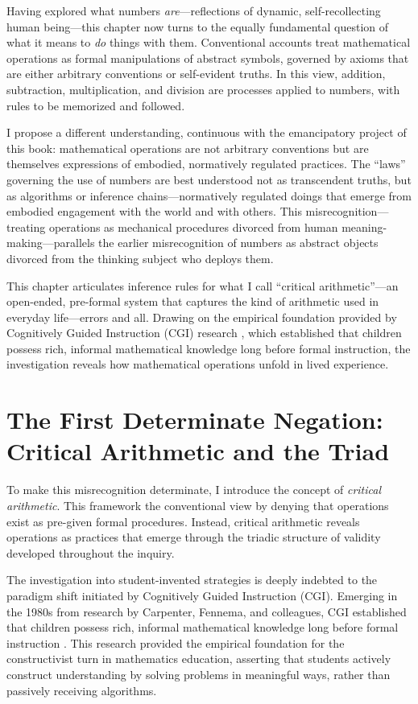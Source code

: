 \documentclass[12pt]{book}
\begin{document}
Having explored what numbers \textit{are}---reflections of dynamic, self-recollecting human being---this chapter now turns to the equally fundamental question of what it means to \textit{do} things with them. Conventional accounts treat mathematical operations as formal manipulations of abstract symbols, governed by axioms that are either arbitrary conventions or self-evident truths. In this view, addition, subtraction, multiplication, and division are processes applied to numbers, with rules to be memorized and followed.

I propose a different understanding, continuous with the emancipatory project of this book: mathematical operations are not arbitrary conventions but are themselves expressions of embodied, normatively regulated practices. The \enquote{laws} governing the use of numbers are best understood not as transcendent truths, but as algorithms or inference chains---normatively regulated doings that emerge from embodied engagement with the world and with others. This misrecognition---treating operations as mechanical procedures divorced from human meaning-making---parallels the earlier misrecognition of numbers as abstract objects divorced from the thinking subject who deploys them.

This chapter articulates inference rules for what I call \enquote{critical arithmetic}---an open-ended, pre-formal system that captures the kind of arithmetic used in everyday life---errors and all. Drawing on the empirical foundation provided by Cognitively Guided Instruction (CGI) research \parencite{Carpenter1999}, which established that children possess rich, informal mathematical knowledge long before formal instruction, the investigation reveals how mathematical operations unfold in lived experience.


\section{The First Determinate Negation: Critical Arithmetic and the Triad}

To make this misrecognition determinate, I introduce the concept of \textit{critical arithmetic}. This framework  the conventional view by denying that operations exist as pre-given formal procedures. Instead, critical arithmetic reveals operations as practices that emerge through the triadic structure of validity developed throughout the inquiry.

The investigation into student-invented strategies is deeply indebted to the paradigm shift initiated by Cognitively Guided Instruction (CGI). Emerging in the 1980s from research by Carpenter, Fennema, and colleagues, CGI established that children possess rich, informal mathematical knowledge long before formal instruction \parencite{Carpenter1999}. This research provided the empirical foundation for the constructivist turn in mathematics education, asserting that students actively construct understanding by solving problems in meaningful ways, rather than passively receiving algorithms.
\end{document}
